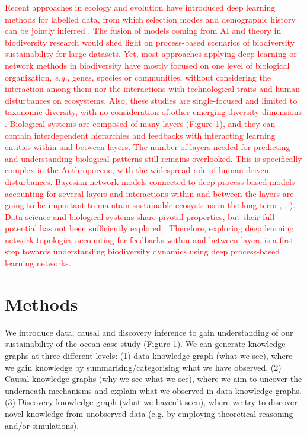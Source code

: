 \documentclass[12pt,a4paper]{article}
\begin{document}

\textcolor{red}{Recent approaches in ecology and evolution have introduced deep learning methods for labelled data, from which selection modes and demographic history can be jointly inferred \citep{sheehan2016deep}. The fusion of models coming from AI and theory in biodiversity research would shed light on process-based scenarios of biodiversity sustainability for large datasets. Yet, most approaches applying deep learning or network methods in biodiversity have mostly focused on one level of biological organization, {\it e.g.}, genes, species or communities, without considering the interaction among them nor the interactions with technological traits and human-disturbances on ecosystems. Also, these studies are single-focused and limited to taxonomic diversity, with no consideration of other emerging diversity dimensions \citep{weiss2019unifying}. Biological systems are composed of many layers (Figure 1), and they can contain interdependent hierarchies and feedbacks with interacting learning entities within and between layers. The number of layers needed for predicting and understanding biological patterns still remains overlooked. This is specifically complex in the Anthropocene, with the widespread role of human-driven disturbances. Bayesian network models connected to deep process-based models accounting for several layers and interactions within and between the layers are going to be important to maintain sustainable ecosystems in the long-term \citep{fontaine2011ecological}, \citep{melian2018deciphering}, \citep{reichstein2019deep}). Data science and biological systems share pivotal properties, but their full potential has not been sufficiently explored \citep{schmidhuber2015deep}. Therefore, exploring deep learning network topologies accounting for feedbacks within and between layers is a first step towards understanding biodiversity dynamics using deep process-based learning networks.}

\section{Methods}

We introduce data, causal and discovery inference to gain understanding of our sustainability of the ocean case study (Figure 1). We can generate knowledge graphs at three different levels: (1) data knowledge graph (what we see), where we gain knowledge by summarising/categorising what we have observed. (2) Causal knowledge graphs (why we see what we see), where we aim to uncover the underneath mechanisms and explain what we observed in data knowledge graphs. (3) Discovery knowledge graph (what we haven't seen), where we try to discover novel knowledge from unobserved data (e.g. by employing theoretical reasoning and/or simulations).
\end{document}
